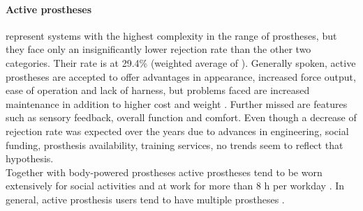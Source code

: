 \documentclass[main]{subfiles}
\begin{document}
\paragraph{Active prostheses} represent systems with the highest complexity in the range of prostheses, but they face only an insignificantly lower rejection rate than the other two categories. Their rate is at 29.4\% (weighted average of \cite{Trost1983,Mendez1985,Glynn1986,Menkveld1987,Datta1989,Ballance1989,Berke1991,Kruger1993,Hubbard1997,Routhier2001,Crandall2002,Hermanson2005,Northmore1980,Herberts1980,Stein1983,vanLunteren1983,Heger1985,Millstein1986,Datta2004,Dalsey1989,Silcox1993,Keijlaa1993}).
Generally spoken, active prostheses are accepted to offer advantages in appearance, increased force output, ease of operation and lack of harness, but problems faced are increased maintenance in addition to higher cost and weight \cite{Scotland1983,Trost1983,Datta1989,Ballance1989,Glynn1986,Weaver1988}.
Further missed are features such as sensory feedback, overall function and comfort. Even though a decrease of rejection rate was expected over the years due to advances in engineering, social funding, prosthesis availability, training services, no trends seem to reflect that hypothesis.\\
Together with body-powered prostheses active prostheses tend to be worn extensively for social activities and at work for more than 8 h per workday \cite{Fraser1998,Crandall2002,Silcox1993,Northmore1980,Hubbard1997,Kyberd1993,Millstein1986,Datta1989,Weaver1988,Keijlaa1993,Scotland1983}.
In general, active prosthesis users tend to have multiple prostheses \cite{Crandall2002,Leow2001,Trost1983,Datta1989,Mendez1985}.
\end{document}
